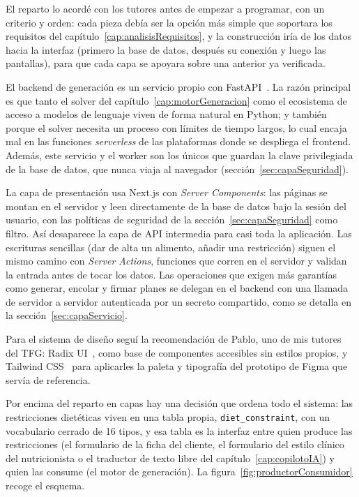 El reparto lo acordé con los tutores antes de empezar a programar, con un criterio y orden: cada pieza debía ser la opción más simple que soportara los requisitos del capítulo~\ref{cap:analisisRequisitos}, y la construcción iría de los datos hacia la interfaz (primero la base de datos, después su conexión y luego las pantallas), para que cada capa se apoyara sobre una anterior ya verificada.

El backend de generación es un servicio propio con FastAPI~\citep{fastapi}. La razón principal es que tanto el solver del capítulo~\ref{cap:motorGeneracion} como el ecosistema de acceso a modelos de lenguaje viven de forma natural en Python; y también porque el solver necesita un proceso con límites de tiempo largos, lo cual encaja mal en las funciones \textit{serverless} de las plataformas donde se despliega el frontend. Además, este servicio y el worker son los únicos que guardan la clave privilegiada de la base de datos, que nunca viaja al navegador (sección~\ref{sec:capaSeguridad}).

La capa de presentación usa Next.js con \textit{Server Components}: las páginas se montan en el servidor y leen directamente de la base de datos bajo la sesión del usuario, con las políticas de seguridad de la sección~\ref{sec:capaSeguridad} como filtro. Así desaparece la capa de API intermedia para casi toda la aplicación. Las escrituras sencillas (dar de alta un alimento, añadir una restricción) siguen el mismo camino con \textit{Server Actions}, funciones que corren en el servidor y validan la entrada antes de tocar los datos. Las operaciones que exigen más garantías como generar, encolar y firmar planes se delegan en el backend con una llamada de servidor a servidor autenticada por un secreto compartido, como se detalla en la sección~\ref{sec:capaServicio}.

Para el sistema de diseño seguí la recomendación de Pablo, uno de mis tutores del TFG: Radix UI~\citep{radix}, como base de componentes accesibles sin estilos propios, y Tailwind CSS~\citep{tailwind} para aplicarles la paleta y tipografía del prototipo de Figma que servía de referencia.

Por encima del reparto en capas hay una decisión que ordena todo el sistema: las restricciones dietéticas viven en una tabla propia, \texttt{diet\_constraint}, con un vocabulario cerrado de 16 tipos, y esa tabla es la interfaz entre quien produce las restricciones (el formulario de la ficha del cliente, el formulario del estilo clínico del nutricionista o el traductor de texto libre del capítulo~\ref{cap:copilotoIA}) y quien las consume (el motor de generación). La figura~\ref{fig:productorConsumidor} recoge el esquema.

